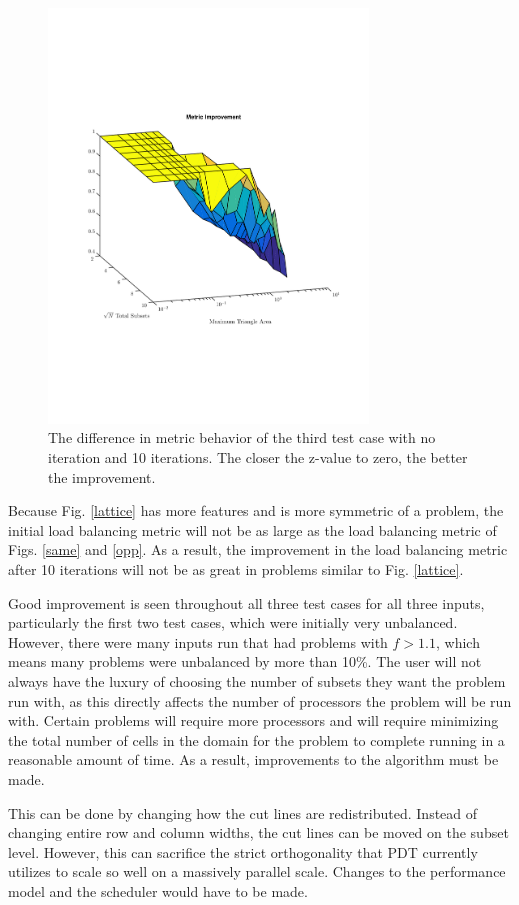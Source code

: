 \documentclass{anstrans}
\begin{document}
\begin{figure}
\centering
\includegraphics[width=85mm, trim = 0cm 5cm 0cm 5cm,clip]{figures/lattice_diff.pdf}
\caption{The difference in metric behavior of the third test case with no iteration and 10 iterations. The closer the z-value to zero, the better the improvement.}
\label{latticediff}
\end{figure}

Because Fig. \ref{lattice} has more features and is more symmetric of a problem, the initial load balancing metric will not be as large as the load balancing metric of Figs. \ref{same} and \ref{opp}. As a result, the improvement in the load balancing metric after 10 iterations will not be as great in problems similar to Fig. \ref{lattice}. 

Good improvement is seen throughout all three test cases for all three inputs, particularly the first two test cases, which were initially very unbalanced. However, there were many inputs run that had problems with $f > 1.1$, which means many problems were unbalanced by more than 10\%. The user will not always have the luxury of choosing the number of subsets they want the problem run with, as this directly affects the number of processors the problem will be run with. Certain problems will require more processors and will require minimizing the total number of cells in the domain for the problem to complete running in a reasonable amount of time. As a result, improvements to the algorithm must be made. 

This can be done by changing how the cut lines are redistributed. Instead of changing entire row and column widths, the cut lines can be moved on the subset level. However, this can sacrifice the strict orthogonality that PDT currently utilizes to scale so well on a massively parallel scale\cite{mpadams2015}. Changes to the performance model and the scheduler would have to be made.
\end{document}
